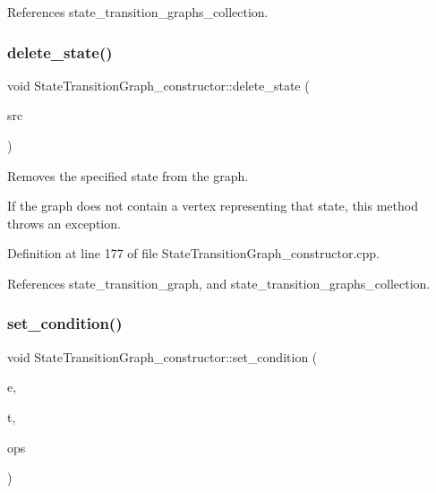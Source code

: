 References state\+\_\+transition\+\_\+graphs\+\_\+collection.

\mbox{\label{classStateTransitionGraph__constructor_aa6076bb71d246e0acb5f04e5cd21f2ad}} 
\subsubsection{\texorpdfstring{delete\+\_\+state()}{delete\_state()}}
{\footnotesize\ttfamily void State\+Transition\+Graph\+\_\+constructor\+::delete\+\_\+state (\begin{DoxyParamCaption}\item[{const \hyperlink{graph_8hpp_abefdcf0544e601805af44eca032cca14}{vertex} \&}]{src }\end{DoxyParamCaption})}



Removes the specified state from the graph. 

If the graph does not contain a vertex representing that state, this method throws an exception. 

Definition at line 177 of file State\+Transition\+Graph\+\_\+constructor.\+cpp.



References state\+\_\+transition\+\_\+graph, and state\+\_\+transition\+\_\+graphs\+\_\+collection.

\mbox{\label{classStateTransitionGraph__constructor_a132a775bfa939e1d2cfb8c45e0051ffa}} 
\subsubsection{\texorpdfstring{set\+\_\+condition()}{set\_condition()}}
{\footnotesize\ttfamily void State\+Transition\+Graph\+\_\+constructor\+::set\+\_\+condition (\begin{DoxyParamCaption}\item[{const \hyperlink{graph_8hpp_a9eb9afea34e09f484b21f2efd263dd48}{Edge\+Descriptor} \&}]{e,  }\item[{\hyperlink{state__transition__graph_8hpp_a73ce4c522d9c8d45a7e1ab48c95a1710}{transition\+\_\+type}}]{t,  }\item[{\hyperlink{graph_8hpp_abefdcf0544e601805af44eca032cca14}{vertex}}]{ops }\end{DoxyParamCaption})}



